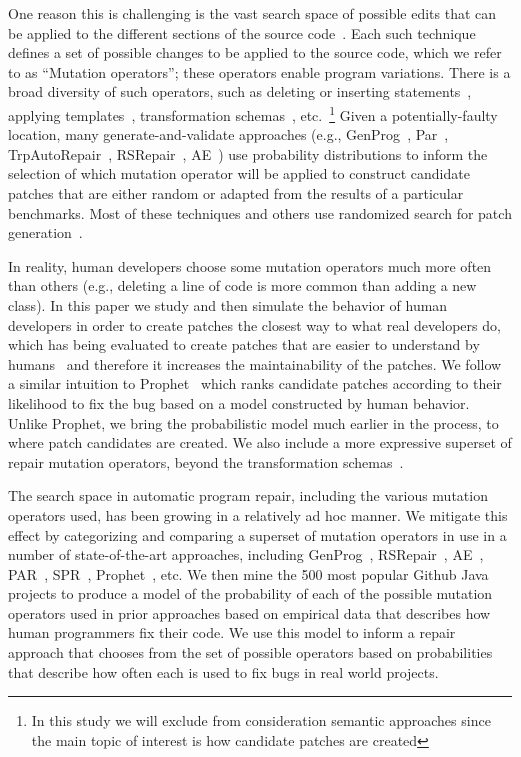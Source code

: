 \documentclass[conference]{IEEEtran}
\begin{document}
One reason this is challenging is the vast search space of possible 
edits that can be applied to the different sections of the source 
code~\cite{long16}. Each such technique defines  a set of possible changes to be
applied to the source code, which we refer to as ``Mutation operators''; these 
operators enable program variations.
There is a broad diversity of such operators, such as deleting or inserting 
statements~\cite{legoues12}, applying templates~\cite{kim2013}, transformation 
schemas~\cite{fan15}, etc.~\footnote{In this study we will exclude 
from 
consideration semantic approaches since the main topic of interest is how 
candidate patches are created} 
Given a potentially-faulty location, many
generate-and-validate approaches (e.g., GenProg~\cite{legoues12}, 
Par~\cite{kim2013}, TrpAutoRepair~\cite{Qi13}, RSRepair~\cite{Qi14},
AE~\cite{Weimer13}) use probability distributions to inform the selection of 
which mutation operator
will be applied to construct candidate patches that are either random or adapted
from the results of a particular benchmarks. Most of these techniques and others 
use randomized search for patch 
generation~\cite{arcuri08,bradbury10,Qi14,Weimer13}.

In reality, human developers choose some mutation operators 
much more often than 
others (e.g., deleting a line of code is more common than adding a new class). In this paper we study and then simulate the behavior of human developers in order 
to create patches the closest way to what real developers do, which has 
being evaluated to create patches that are easier to understand by
humans~\cite{kim2013} and 
therefore it increases the maintainability of the patches. We follow a similar
intuition to Prophet~\cite{long15} which ranks candidate patches
according to their likelihood to fix the bug based on a model constructed by
human behavior. Unlike Prophet, we bring the
probabilistic model much earlier in the process, to where
patch candidates are created. We also include a more expressive superset of repair mutation
operators, beyond the transformation schemas~\cite{fan15}.  

The search space in automatic program repair, including the various mutation
operators used, has been growing in a relatively ad hoc 
manner. We mitigate this effect by categorizing and comparing a superset of
mutation operators in use in a number of 
state-of-the-art approaches, including GenProg~\cite{legoues12}, RSRepair~\cite{Qi14}, AE~\cite{Weimer13}, PAR~\cite{kim2013}, 
SPR~\cite{fan15},
Prophet~\cite{Long2016}, etc.
We then mine
the 500 most popular Github Java projects to produce a model of the probability of
each of the possible mutation operators used in prior approaches based on 
empirical data that describes how human programmers fix their code.  We use this
model to inform a repair approach that chooses from the set of possible
operators based on 
probabilities that describe how often each is used
to fix bugs in real world projects. 
\end{document}
